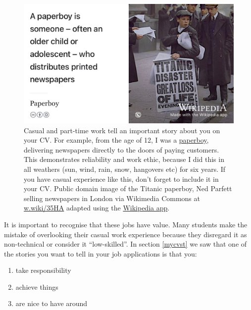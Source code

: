 \documentclass[
]{book}
\providecommand{\tightlist}{%
  \setlength{\itemsep}{0pt}\setlength{\parskip}{0pt}}
\begin{document}
\begin{figure}

{\centering \includegraphics[width=0.99\linewidth]{images/Titanic-paperboy-crop} 

}

\caption{Casual and part-time work tell an important story about you on your CV. For example, from the age of 12, I was a \href{https://en.wikipedia.org/wiki/Paperboy}{paperboy}, delivering newspapers directly to the doors of paying customers. This demonstrates reliability and work ethic, because I did this in all weathers (sun, wind, rain, snow, hangovers etc) for six years. If you have casual experience like this, don't forget to include it in your CV. Public domain image of the Titanic paperboy, Ned Parfett selling newspapers in London via Wikimedia Commons at \href{https://w.wiki/35HA}{w.wiki/35HA} adapted using the \href{https://apps.apple.com/us/app/wikipedia/id324715238}{Wikipedia app}.}\label{fig:paperboy-fig}
\end{figure}



It is important to recognise that these jobs have value. Many students make the mistake of overlooking their casual work experience because they disregard it as non-technical or consider it ``low-skilled''. In section \ref{mycvst} we saw that one of the stories you want to tell in your job applications is that you:

\begin{enumerate}
\def\labelenumi{\arabic{enumi}.}
\tightlist
\item
  take responsibility
\item
  achieve things
\item
  are nice to have around
\end{enumerate}
\end{document}
